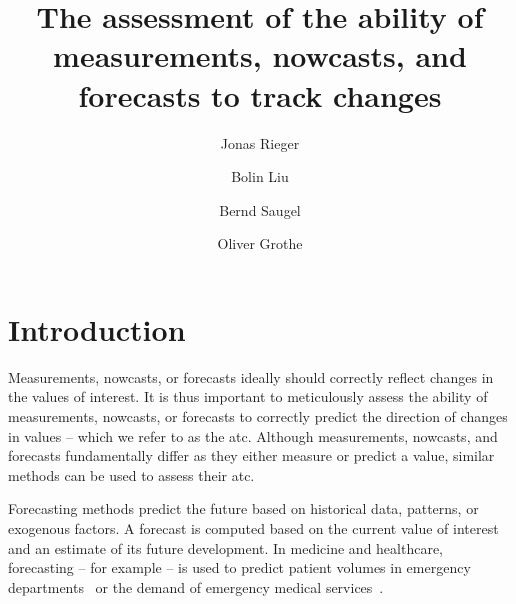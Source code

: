 \documentclass[pdflatex]{sn-jnl}
\theoremstyle{plain}%
\theoremstyle{definition}
\begin{document}
\title{The assessment of the ability of measurements, nowcasts, and forecasts to track changes}
\author*[1]{Jonas Rieger}
\author[1]{Bolin Liu}
\author[2]{Bernd Saugel}
\author[1]{Oliver Grothe}

\keywords{}

\maketitle



\section{Introduction}\label{sec:atc-introduction}

Measurements, nowcasts, or forecasts ideally should correctly reflect changes in the values of interest. It is thus important to meticulously assess the ability of measurements, nowcasts, or forecasts to correctly predict the direction of changes in values – which we refer to as the \acf{atc}. Although measurements, nowcasts, and forecasts fundamentally differ as they either measure or predict a value, similar methods can be used to assess their \ac{atc}.

Forecasting methods predict the future based on historical data, patterns, or exogenous factors. A forecast is computed based on the current value of interest and an estimate of its future development.
In medicine and healthcare, forecasting – for example – is used to predict patient volumes in emergency departments~\parencite{Jones2008, Rostami-Tabar2023} or the demand of emergency medical services~\parencite{HaugsboHermansen2021}.
\end{document}
